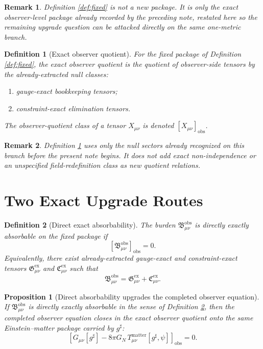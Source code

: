 \documentclass[11pt]{article}
\newcommand{\CompletedMetric}{g^{\sharp}}
\newcommand{\ObsBurden}{\mathfrak B_{\mu\nu}^{\mathrm{obs}}}
\newcommand{\ObserverClass}[1]{\left[#1\right]_{\mathrm{obs}}}
\newcommand{\GaugeExact}{\mathfrak G_{\mu\nu}^{\mathrm{ex}}}
\newcommand{\ConstraintExact}{\mathfrak C_{\mu\nu}^{\mathrm{ex}}}
\newtheorem{definition}{Definition}
\newtheorem{proposition}{Proposition}
\newtheorem{remark}{Remark}
\begin{document}
\begin{remark}
Definition \ref{def:fixed} is not a new package. It is only the exact observer-level package already recorded by the preceding note, restated here so the remaining upgrade question can be attacked directly on the same one-metric branch.
\end{remark}

\begin{definition}[Exact observer quotient]
\label{def:quot}
For the fixed package of Definition \ref{def:fixed}, the \emph{exact observer quotient} is the quotient of observer-side tensors by the already-extracted null classes:
\begin{enumerate}
    \item gauge-exact bookkeeping tensors;
    \item constraint-exact elimination tensors.
\end{enumerate}
The observer-quotient class of a tensor \(X_{\mu\nu}\) is denoted \(\ObserverClass{X_{\mu\nu}}\).
\end{definition}

\begin{remark}
Definition \ref{def:quot} uses only the null sectors already recognized on this branch before the present note begins. It does \emph{not} add exact non-independence or an unspecified field-redefinition class as new quotient relations.
\end{remark}

\section{Two Exact Upgrade Routes}

\begin{definition}[Direct exact absorbability]
\label{def:direct}
The burden \(\ObsBurden\) is \emph{directly exactly absorbable} on the fixed package if
\begin{equation}
\ObserverClass{\ObsBurden}=0.
\label{eq:obsvanish}
\end{equation}
Equivalently, there exist already-extracted gauge-exact and constraint-exact tensors \(\GaugeExact\) and \(\ConstraintExact\) such that
\begin{equation}
\ObsBurden=\GaugeExact+\ConstraintExact.
\label{eq:direct}
\end{equation}
\end{definition}

\begin{proposition}[Direct absorbability upgrades the completed observer equation]
\label{prop:direct}
If \(\ObsBurden\) is directly exactly absorbable in the sense of Definition \ref{def:direct}, then the completed observer equation closes in the exact observer quotient onto the same Einstein--matter package carried by \(\CompletedMetric\):
\begin{equation}
\ObserverClass{G_{\mu\nu}[\CompletedMetric]-8\pi G_N\,T_{\mu\nu}^{\mathrm{matter}}[\CompletedMetric,\psi]}=0.
\label{eq:quotclose}
\end{equation}
\end{proposition}
\end{document}
